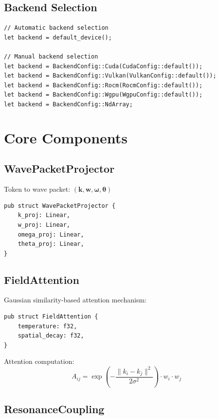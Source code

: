 \documentclass{article}
\begin{document}
\subsection{Backend Selection}

\begin{verbatim}
// Automatic backend selection
let backend = default_device();

// Manual backend selection
let backend = BackendConfig::Cuda(CudaConfig::default());
let backend = BackendConfig::Vulkan(VulkanConfig::default());
let backend = BackendConfig::Rocm(RocmConfig::default());
let backend = BackendConfig::Wgpu(WgpuConfig::default());
let backend = BackendConfig::NdArray;
\end{verbatim}

\section{Core Components}

\subsection{WavePacketProjector}

Token to wave packet: $(\mathbf{k}, \mathbf{w}, \boldsymbol{\omega}, \boldsymbol{\theta})$

\begin{verbatim}
pub struct WavePacketProjector {
    k_proj: Linear,
    w_proj: Linear,
    omega_proj: Linear,
    theta_proj: Linear,
}
\end{verbatim}

\subsection{FieldAttention}

Gaussian similarity-based attention mechanism:

\begin{verbatim}
pub struct FieldAttention {
    temperature: f32,
    spatial_decay: f32,
}
\end{verbatim}

Attention computation:
\begin{equation}
A_{ij} = \exp\left(-\frac{\|k_i - k_j\|^2}{2\sigma^2}\right) \cdot w_i \cdot w_j
\end{equation}

\subsection{ResonanceCoupling}
\end{document}

